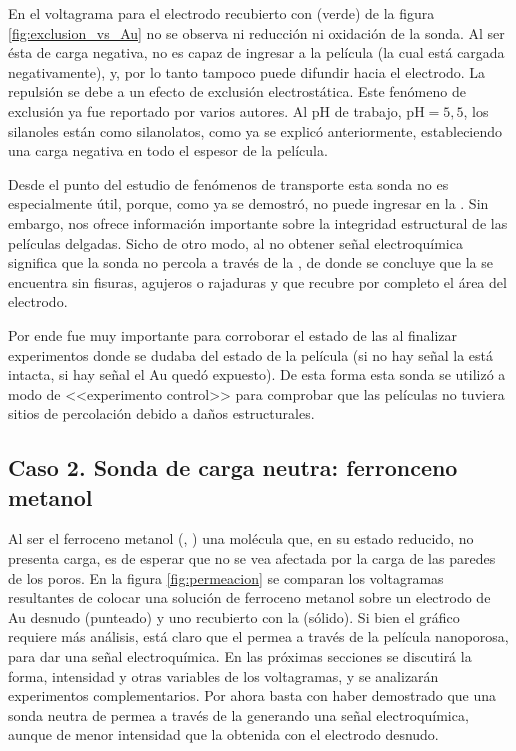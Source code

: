 	 En el voltagrama para el electrodo recubierto con \pdmF\space (verde) de la figura \ref{fig:exclusion_vs_Au} no se observa ni reducción ni oxidación de la sonda. Al ser ésta de carga negativa, no es capaz de ingresar a la película (la cual está cargada negativamente), y, por lo tanto tampoco puede difundir hacia el electrodo. La repulsión se debe a un efecto de exclusión electrostática. Este fenómeno de exclusión ya fue reportado por varios autores\cite{alberti2015,schmuhl2005,Andrieu-Brunsen2015,brunsen2011}. Al pH de trabajo, $\text{pH}=5,5$, los silanoles están como silanolatos, como ya se explicó anteriormente, estableciendo una carga negativa en todo el espesor de la película.

	 Desde el punto del estudio de fenómenos de  transporte esta sonda no es especialmente útil, porque, como ya se demostró, no puede ingresar en la \pdm. Sin embargo, nos ofrece información importante sobre la integridad estructural de las películas delgadas. Sicho de otro modo, al no obtener señal electroquímica significa que la sonda no percola a través de la \pdm, de donde se concluye que la \pdm\space se encuentra sin fisuras, agujeros o rajaduras y que recubre por completo el área del electrodo. 

	 Por ende fue muy importante para corroborar el estado de las \pdm\space al finalizar experimentos donde se dudaba del estado de la película (si no hay señal la \pdm está intacta, si hay señal el Au quedó expuesto). De esta forma esta sonda se utilizó a modo de <<experimento control>> para comprobar que las películas no tuviera sitios de percolación debido a daños estructurales.

	\subsection{Caso 2. Sonda de carga neutra: ferronceno metanol}

		Al ser el ferroceno metanol (\ferroceno, \fc) una molécula que, en su estado reducido, no presenta carga, es de esperar que no se vea afectada por la carga de las paredes de los poros. En la figura \ref{fig:permeacion} se comparan los voltagramas resultantes de colocar una solución de ferroceno metanol sobre un electrodo de Au desnudo (punteado) y uno recubierto con la \pdm\space (sólido).  Si bien el gráfico  requiere más análisis, está claro que el \fc\space permea a través de la película nanoporosa, para dar una señal electroquímica. En las próximas secciones se discutirá la forma, intensidad y otras variables de los voltagramas, y se analizarán experimentos complementarios. Por ahora basta con haber demostrado que una sonda neutra de permea a través de la \pdm\space generando una señal electroquímica, aunque de menor intensidad que la obtenida con el electrodo desnudo.

